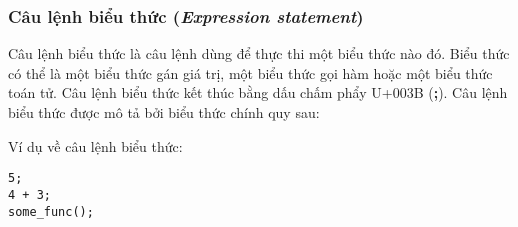 \subsubsection{Câu lệnh biểu thức (\textit{Expression statement})}            
\label{ch2:expr_stmt}
    Câu lệnh biểu thức là câu lệnh dùng để thực thi một biểu thức nào đó. Biểu thức có thể là một biểu thức gán giá trị, một biểu thức gọi hàm hoặc một biểu thức toán tử. Câu lệnh biểu thức kết thúc bằng dấu chấm phẩy U+003B (\textbf{;}). Câu lệnh biểu thức được mô tả bởi biểu thức chính quy sau:

\regexexprstmt

\noindent Ví dụ về câu lệnh biểu thức:
\begin{lstlisting}[]
5;
4 + 3;
some_func();
\end{lstlisting}
